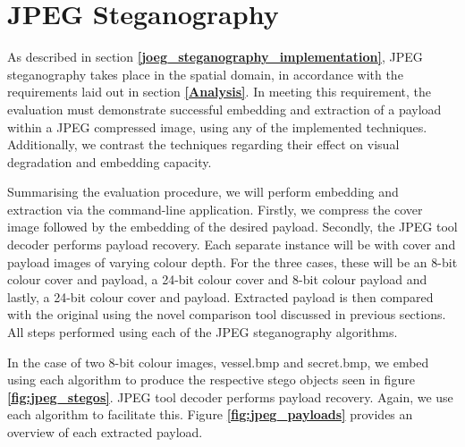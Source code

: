 \documentclass{l4proj}
\begin{document}
\section{JPEG Steganography}\label{jpeg_steganography}

As described in section \textbf{\ref{joeg_steganography_implementation}}, JPEG steganography takes place in the spatial domain, in accordance with the requirements laid out in section \textbf{\ref{Analysis}}. In meeting this requirement, the evaluation must demonstrate successful embedding and extraction of a payload within a JPEG compressed image, using any of the implemented techniques. Additionally, we contrast the techniques regarding their effect on visual degradation and embedding capacity.

Summarising the evaluation procedure, we will perform embedding and extraction via the command-line application. Firstly, we compress the cover image followed by the embedding of the desired payload. Secondly,  the JPEG tool decoder performs payload recovery. Each separate instance will be with cover and payload images of varying colour depth. For the three cases, these will be an 8-bit colour cover and payload, a 24-bit colour cover and 8-bit colour payload and lastly, a 24-bit colour cover and payload.  Extracted payload is then compared with the original using the novel comparison tool discussed in previous sections. All steps performed using each of the JPEG steganography algorithms.

In the case of two 8-bit colour images, vessel.bmp and secret.bmp, we embed using each algorithm to produce the respective stego objects seen in figure \textbf{\ref{fig:jpeg_stegos}}. JPEG tool decoder performs payload recovery. Again, we use each algorithm to facilitate this. Figure \textbf{\ref{fig:jpeg_payloads}} provides an overview of each extracted payload.
\end{document}

